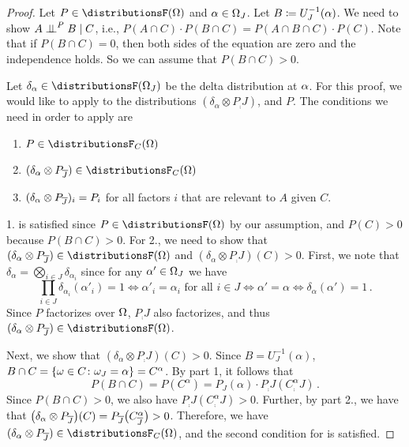 \documentclass[USenglish,onecolumn]{article}
\begin{document}
\begin{proof}
  Let $P \in \distributionsF(\Omg)$ and $\alpha \in \Omega_J$.
  Let $B \coloneq U_J^{-1}(\alpha)$.
  We need to show $A \mathrel{\perp\!\!\!\perp}^P B \mid C$, i.e., $P(A \cap C) \cdot P(B \cap C) = P(A \cap B \cap C) \cdot P(C)$.
  Note that if $P(B \cap C) = 0$, then both sides of the equation are zero and the independence holds. So we can assume that $P(B \cap C) > 0$.

  Let $\delta_\x \in \distributionsF(\Omg_J)$ be the delta distribution at $\alpha$.
  For this proof, we would like to apply  to the distributions $(\delta_\alpha\otimes P_\comp{J})$, and $P$. The conditions we need in order to apply  are
  \begin{enumerate}
      \item $P\in\distributionsF_C(\Omg)$
      \item $(\delta_\alpha\otimes P_\comp{J})\in \distributionsF_C(\Omg)$
      \item $(\delta_\alpha \otimes P_{{\overline{J}}})_i=P_i$ for all factors $i$ that are relevant to $A$ given $C$.
  \end{enumerate}
%
1. is satisfied since $P\in\distributionsF(\Omg)$ by our assumption, and $P(C)>0$ because $P(B\cap C)>0$.
%
For 2., we need to show that $(\delta_\alpha\otimes P_\comp{J})\in \distributionsF(\Omg)$ and  $(\delta_\alpha\otimes P_\comp{J})(C)>0$.
  First, we note that $\delta_\alpha = \bigotimes_{i\in J}\delta_{\alpha_i}$ since for any $\alpha'\in \Omega_J$ we have
  \begin{equation}
  \label{eq:delta_factorizes}
      \prod_{i\in J}\delta_{\alpha_i}(\alpha'_i)=1 \iff \alpha'_i=\alpha_i \text{ for all $i\in J$} \iff  \alpha'=\alpha\iff \delta_\alpha(\alpha') = 1\,.
  \end{equation}
  Since $P$ factorizes over $\Omega$, $P_\comp{J}$ also factorizes, and thus $(\delta_\alpha\otimes P_\comp{J}) \in \distributionsF(\Omg)$.

  Next, we show that $(\delta_\alpha\otimes P_\comp{J})(C)>0$.
%
Since $B=U_J^{-1}(\alpha)$, $B\cap C =
\{\omega\in C\colon \omega_J=\alpha\}=C^\alpha$. By  part 1, it follows that
\begin{equation}
    \label{eq:BcapC_probability}
P(B\cap C)=P(C^\alpha)=P_J(\alpha)\cdot P_\comp{J}(C^\alpha_\comp{J})\,.
\end{equation}
Since $P(B\cap C)>0$, we also have $P_\comp{J}(C^\alpha_\comp{J})>0$.
  Further, by  part 2., we have that
    $\big( \delta_\alpha \otimes P_{{\overline{J}}} \big)(C) = P_{{\overline{J}}}\big( C^\alpha_{\overline{J}} \big)
    > 0$.
  Therefore, we have $(\delta_\alpha \otimes P_\comp{J})\in \distributionsF_C(\Omg)$, and the second condition for  is satisfied.


\end{proof}
\end{document}
